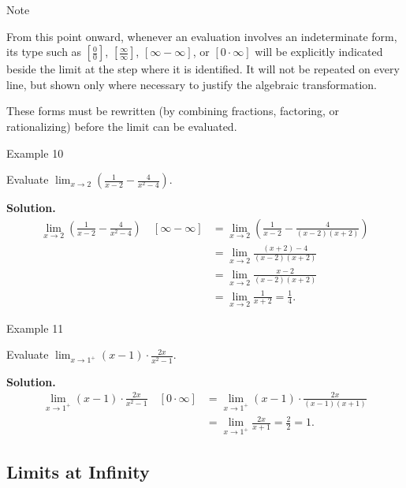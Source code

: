 \begin{remarkbox}{Note}

From this point onward, whenever an evaluation involves an indeterminate form, its type such as \(\left[ \frac{0}{0}\right]\), \(\left[ \frac{\infty}{\infty}\right]\), \(\left[ \infty - \infty\right]\), or \(\left[ 0 \cdot \infty\right]\) will be explicitly indicated beside the limit at the step where it is identified. It will not be repeated on every line, but shown only where necessary to justify the algebraic transformation.
\end{remarkbox}

These forms must be rewritten (by combining fractions, factoring, or rationalizing) before the limit can be evaluated.


\begin{examplebox}{Example 10}

Evaluate \(\displaystyle\lim_{x \to 2} \left( \frac{1}{x - 2} - \frac{4}{x^{2} - 4} \right)\).

\medskip
\textbf{Solution.}
\begin{align*}
\lim_{x \to 2} \left( \frac{1}{x - 2} - \frac{4}{x^{2} - 4} \right) \quad [\infty - \infty]
    &= \lim_{x \to 2} \left( \frac{1}{x - 2} - \frac{4}{(x - 2)(x + 2)} \right) \\[6pt]
    &= \lim_{x \to 2} \frac{(x + 2) - 4}{(x - 2)(x + 2)} \\[6pt]
    &= \lim_{x \to 2} \frac{x - 2}{(x - 2)(x + 2)} \\[6pt]
    &= \lim_{x \to 2} \frac{1}{x + 2}
     = \frac{1}{4}.
\end{align*}
\end{examplebox}


\begin{examplebox}{Example 11}

Evaluate \(\displaystyle\lim_{x \to 1^{+}} (x - 1) \cdot \frac{2x}{x^{2} - 1}\).

\medskip
\textbf{Solution.}
\begin{align*}
\lim_{x \to 1^{+}} (x - 1) \cdot \frac{2x}{x^{2} - 1} \quad [0 \cdot \infty]
    &= \lim_{x \to 1^{+}} (x - 1) \cdot \frac{2x}{(x - 1)(x + 1)} \\[6pt]
    &= \lim_{x \to 1^{+}} \frac{2x}{x + 1}
     = \frac{2}{2}
     = 1.
\end{align*}
\end{examplebox}

\bigskip


\subsection*{Limits at Infinity}
\label{subsec:1.3.3}


